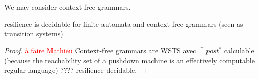 


We may consider context-free grammars.

\begin{corollary}
{\sc resilience} is decidable for finite automata and context-free grammars (seen as transition systems)
\end{corollary}

\begin{proof}

  \textcolor{red}{à faire Mathieu}
Context-free grammars are WSTS \cite{DBLP:journals/tcs/FinkelS01} avec $\uparrow post^*$ calculable (because the reachability set of a pushdown machine is an effectively computable regular language) ???? resilience decidable.
\end{proof}


\cite{DBLP:journals/ipl/BouajjaniEFMRWW00}











